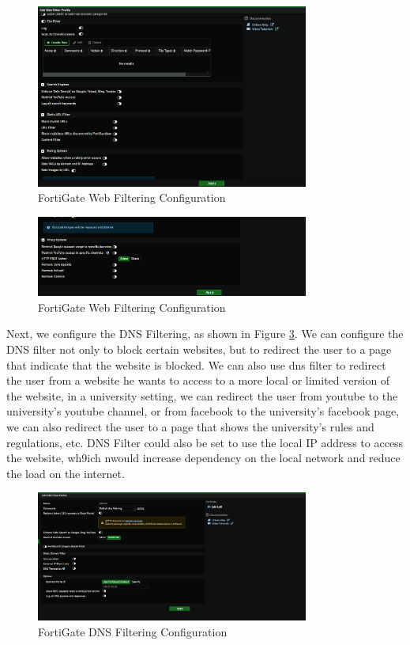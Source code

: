 \documentclass[12pt]{report}
\begin{document}
\begin{figure}
    \centering
    \includegraphics[width=0.8\textwidth]{images/Implementation/wf2.png}
    \caption{FortiGate Web Filtering Configuration}
    \label{fig:wf2}
\end{figure}
\begin{figure}
    \centering
    \includegraphics[width=0.8\textwidth]{images/Implementation/wf3.png}
    \caption{FortiGate Web Filtering Configuration}
    \label{fig:wf3}
\end{figure}
Next, we configure the DNS Filtering, as shown in Figure \ref{fig:dnsf}. We can configure the DNS filter not only to block certain websites, but to redirect the user to a page that indicate that the website is blocked. We can also use dns filter to redirect the user from a website he wants to access to a more local or limited version of the website, in a university setting, we can redirect the user from youtube to the university's youtube channel, or from facebook to the university's facebook page, we can also redirect the user to a page that shows the university's rules and regulations, etc. DNS Filter could also be set to use the local IP address to access the website, wh9ich nwould increase dependency on the local network and reduce the load on the internet.
\begin{figure}
    \centering
    \includegraphics[width=0.8\textwidth]{images/Implementation/dnsf.png}
    \caption{FortiGate DNS Filtering Configuration}
    \label{fig:dnsf}
\end{figure}
\end{document}
